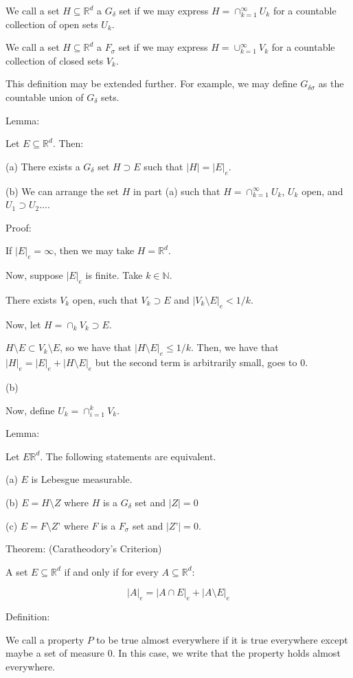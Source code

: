 \documentclass[10pt]{article}
\begin{document}
We call a set $H \subseteq \mathbb{R}^d$ a $G_\delta$ set if we may express $H = \cap_{k=1}^\infty U_k$ for a countable collection of open sets $U_k$.

We call a set $H \subseteq \mathbb{R}^d$  a $F_\sigma$ set if we may express $H = \cup_{k=1}^\infty V_k$ for a countable collection of closed sets $V_k$.

This definition may be extended further. For example, we may define $G_{\delta\sigma}$ as the countable union of $G_\delta$ sets.

Lemma:

Let $E \subseteq \mathbb{R}^d$. Then:

(a) There exists a $G_\delta$ set $H \supset E$ such that $ |H| = |E|_e$.

(b) We can arrange the set $H$ in part (a) such that $H = \cap_{k=1}^\infty U_k$, $U_k$ open, and $U_1 \supset U_2 ...$.

Proof:

If $|E|_e = \infty$, then we may take $H = \mathbb{R}^d$.

Now, suppose $|E|_e$ is finite. Take $k \in \mathbb{N}$.

There exists $V_k$ open, such that $V_k \supset E$ and $|V_k \setminus E|_e < 1/k$.

Now, let $H = \cap_k V_k \supset E$.

$ H \setminus E \subset V_k \setminus E$, so we have that $|H \setminus E|_e \leq 1/k$. Then, we have that $|H|_e = |E|_e + |H \setminus E|_e$ but the second term is arbitrarily small, goes to 0. 

(b)

Now, define $U_k  = \cap_{i=1}^k V_k$.

Lemma:

Let $E \mathbb{R}^d$. The following statements are equivalent.

(a) $E$ is Lebesgue measurable.

(b) $E = H \setminus Z$ where $H$ is a $G_\delta$ set and $|Z| = 0$

(c) $E = F \setminus Z’$ where $F$ is a $F_\sigma$ set and $|Z’| = 0$.


Theorem: (Caratheodory’s Criterion)

A set $E \subseteq \mathbb{R}^d$ if and only if for every $A \subseteq \mathbb{R}^d$:

$$ |A|_e = |A \cap E|_e + |A \setminus E|_e$$

Definition:

We call a property $P$ to be true almost everywhere if it is true everywhere except maybe a set of measure 0. In this case, we write that the property holds almost everywhere.
\end{document}
